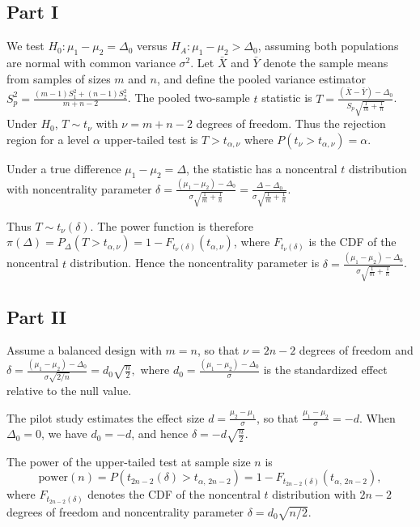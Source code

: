 \documentclass[letterpaper]{article}
\begin{document}
		\subsection{Part I}
		
		We test
		$H_0:\mu_1-\mu_2=\Delta_0$
		versus
		$H_A:\mu_1-\mu_2>\Delta_0$,
		assuming both populations are normal with common variance $\sigma^2$. Let $\bar X$ and $\bar Y$ denote the sample means from samples of sizes
		$m$ and $n$, and define the pooled variance estimator
		$S_p^2=\frac{(m-1)S_1^2+(n-1)S_2^2}{m+n-2}$. The pooled two-sample $t$ statistic is
		$T=\frac{(\bar X-\bar Y)-\Delta_0}{S_p\sqrt{\frac1m+\frac1n}}$. Under $H_0$, $T\sim t_\nu$ with $\nu=m+n-2$ degrees of freedom.  
		Thus the rejection region for a level $\alpha$ upper-tailed test is
		$T>t_{\alpha,\nu}$ where $P(t_\nu>t_{\alpha,\nu})=\alpha$.
		
		Under a true difference $\mu_1-\mu_2=\Delta$, the statistic has a
		noncentral $t$ distribution with noncentrality parameter $\delta=\frac{(\mu_1-\mu_2)-\Delta_0}{\sigma\sqrt{\frac1m+\frac1n}}
		=\frac{\Delta-\Delta_0}{\sigma\sqrt{\frac1m+\frac1n}}$.
		
		Thus $T\sim t_\nu(\delta)$. The power function is therefore $\pi(\Delta)
		=P_\Delta(T>t_{\alpha,\nu})
		=1-F_{t_\nu(\delta)}(t_{\alpha,\nu})$, where $F_{t_\nu(\delta)}$ is the CDF of the noncentral $t$ distribution. Hence the noncentrality parameter is ${\delta=\frac{(\mu_1-\mu_2)-\Delta_0}{\sigma\sqrt{\frac1m+\frac1n}}}$.
		
		\clearpage
		
		\subsection{Part II}
		
		
		Assume a balanced design with $m=n$, so that $\nu=2n-2$ degrees of freedom and
		$\delta=\frac{(\mu_1-\mu_2)-\Delta_0}{\sigma\sqrt{2/n}}=d_0\sqrt{\frac{n}{2}},$
		where $d_0=\frac{(\mu_1-\mu_2)-\Delta_0}{\sigma}$ is the standardized effect relative to the null value.
		
		The pilot study estimates the effect size $d=\frac{\mu_2-\mu_1}{\sigma}$, so that $\frac{\mu_1-\mu_2}{\sigma}=-d$. When $\Delta_0=0$, we have $d_0=-d$, and hence
		$\delta = -d\sqrt{\frac{n}{2}}.$
		
		The power of the upper-tailed test at sample size $n$ is
		$$\text{power}(n) = P(t_{2n-2}(\delta) > t_{\alpha,\,2n-2}) = 1 - F_{t_{2n-2}(\delta)}(t_{\alpha,\,2n-2}),$$
		where $F_{t_{2n-2}(\delta)}$ denotes the CDF of the noncentral $t$ distribution with $2n-2$ degrees of freedom and noncentrality parameter $\delta=d_0\sqrt{n/2}$.
		
\end{document}
